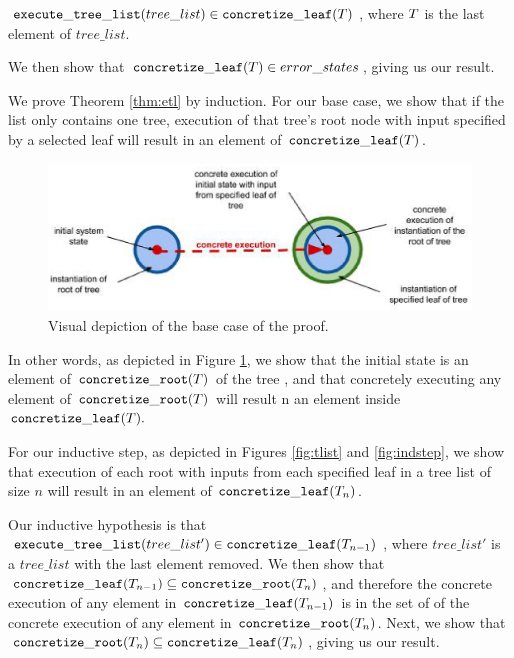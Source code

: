 \begin{theorem}
\label{thm:etl}
 $\mathtt{execute\_tree\_list} (tree\_list) \in \mathtt{concretize\_leaf} (T)$, where $T$ is the last element of $tree\_list$.
\end{theorem}

We then show that $\mathtt{concretize\_leaf} (T) \in error\_states$, giving us our result.

We prove Theorem \ref{thm:etl} by induction. 
For our base case, we show that if the list only contains one tree, execution of that tree's root node with input specified by a selected leaf will result in an element of $\mathtt{concretize\_leaf}(T)$.

\begin{figure}
\centering
\includegraphics[width=.8\textwidth]{set3.eps}
\caption{Visual depiction of the base case of the proof.}
\label{fig:basecase}
\end{figure}

In other words, as depicted in Figure \ref{fig:basecase}, we show that the initial state is an element of $\mathtt{concretize\_root}(T)$ of the tree \tree, and that concretely executing any element of $\mathtt{concretize\_root}(T)$ will result n an element inside $\mathtt{concretize\_leaf}(T).$



For our inductive step, as depicted in Figures  \ref{fig:tlist} and \ref{fig:indstep}, we show that execution of each root with inputs from each specified leaf in a tree list of size $n$ will result in an element of $\mathtt{concretize\_leaf}(T_n)$.

Our inductive hypothesis is that $\mathtt{execute\_tree\_list }(tree\_list') \in \mathtt{concretize\_leaf} (T_{n-1})$, where $tree\_list'$ is a $tree\_list$ with the last element removed. We then show that $\mathtt{concretize\_leaf} (T_{n-1}) \subseteq \mathtt{concretize\_root} (T_{n}) $, and therefore the concrete execution of any element in $\mathtt{concretize\_leaf} (T_{n-1}) $ is in the set of of the concrete execution of any element in $\mathtt{concretize\_root} (T_{n})$. Next, we show that $\mathtt{concretize\_root} (T_{n}) \subseteq \mathtt{concretize\_leaf} (T_{n})$, giving us our result.
 
